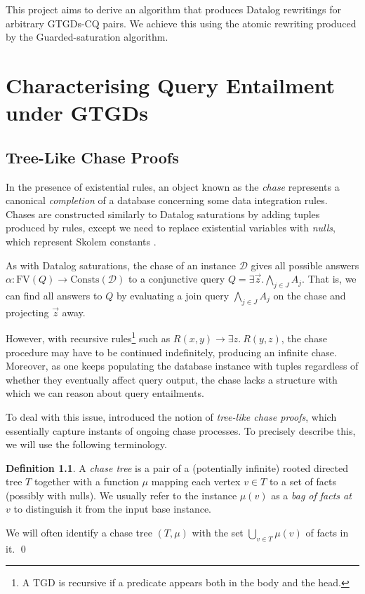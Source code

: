 \documentclass[12pt]{report}
\theoremstyle{plain}
\theoremstyle{definition}
\newtheorem{definition}[theorem]{Definition}
\def\FV{{\mathrm{FV}}}
\def\Consts{{\mathrm{Consts}}}
\begin{document}
This project aims to derive an algorithm that produces Datalog rewritings for arbitrary GTGDs-CQ pairs. We achieve this using the atomic rewriting produced by the Guarded-saturation algorithm.

\newpage
\chapter{Characterising Query Entailment under GTGDs}
\label{characterising-query-entailment-under-gtgds}

\section{Tree-Like Chase Proofs}

In the presence of existential rules, an object known as the \emph{chase} represents a canonical \emph{completion} of a database concerning some data integration rules. Chases are constructed similarly to Datalog saturations by adding tuples produced by rules, except we need to replace existential variables with \emph{nulls}, which represent Skolem constants \cite{fagin_kolaitis_miller_popa_2005}.

As with Datalog saturations, the chase of an instance $\mathcal{D}$ gives all possible answers $\alpha: \FV(Q) \rightarrow \Consts(\mathcal{D})$ to a conjunctive query $Q = \exists \vec{z}. \bigwedge_{j \in J} A_j$. That is, we can find all answers to $Q$ by evaluating a join query $\bigwedge_{j \in J} A_j$ on the chase and projecting $\vec{z}$ away.

However, with recursive rules\footnote{A TGD is recursive if a predicate appears both in the body and the head.} such as $R(x, y) \rightarrow \exists z.\ R(y, z)$, the chase procedure may have to be continued indefinitely, producing an infinite chase. Moreover, as one keeps populating the database instance with tuples regardless of whether they eventually affect query output, the chase lacks a structure with which we can reason about query entailments.

To deal with this issue, \cite{benedikt_buron_germano_kappelmann_motik_2022} introduced the notion of \emph{tree-like chase proofs}, which essentially capture instants of ongoing chase processes. To precisely describe this, we will use the following terminology.

\begin{definition}
  A \emph{chase tree} is a pair of a (potentially infinite) rooted directed tree $T$ together with a function $\mu$ mapping each vertex $v \in T$ to a set of facts (possibly with nulls). We usually refer to the instance $\mu(v)$ as a \emph{bag of facts at $v$} to distinguish it from the input base instance.
  
  We will often identify a chase tree $(T, \mu)$ with the set $\bigcup_{v \in T} \mu(v)$ of facts in it.
  \qed
\end{definition}
\end{document}
